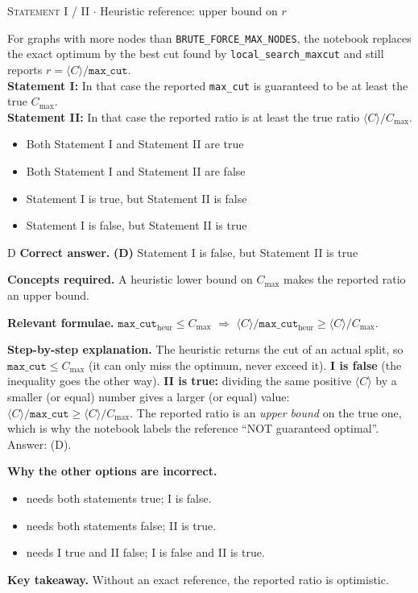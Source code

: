 \documentclass[11pt,a4paper]{article}
\newcommand{\optlabel}[1]{\textbf{(#1)}}
\newcommand{\correctlabel}[1]{\textcolor{okgreen}{\textbf{(#1)}\,\ding{51}}}
\newenvironment{qitem}[1]{\begin{list}{}{\setlength{\leftmargin}{3.3em}\setlength{\labelwidth}{3.1em}%
  \setlength{\labelsep}{0.2em}\setlength{\topsep}{3pt}\setlength{\parsep}{3pt}}\item[\textbf{Q.#1}\hfill]}{\end{list}}
\newcommand{\qsep}{\par\vspace{2pt}{\color{black!15}\hrule}\vspace{4pt}}
\newcommand{\qmeta}[2]{{\footnotesize\color{black!60}\textsc{#1} \;$\cdot$\; #2}\par}
\begin{document}
\begin{qitem}{74}
\qmeta{Statement I / II}{Heuristic reference: upper bound on $r$}
For graphs with more nodes than \texttt{BRUTE\_FORCE\_MAX\_NODES}, the notebook replaces the exact optimum by the best cut found
by \texttt{local\_search\_maxcut} and still reports $r = \langle C\rangle/\texttt{max\_cut}$.\\[1mm]
\textbf{Statement I:} In that case the reported \texttt{max\_cut} is guaranteed to be at least the true $C_{\max}$.\\[1mm]
\textbf{Statement II:} In that case the reported ratio is at least the true ratio $\langle C\rangle/C_{\max}$.
\begin{itemize}[leftmargin=2.6em, labelsep=0.4em, itemsep=2pt, topsep=3pt]
\item[\optlabel{A}] Both Statement I and Statement II are true
\item[\optlabel{B}] Both Statement I and Statement II are false
\item[\optlabel{C}] Statement I is true, but Statement II is false
\item[\correctlabel{D}] Statement I is false, but Statement II is true
\end{itemize}
\end{qitem}
\begin{solbox}{D}
\textbf{\color{brand}Correct answer.} \textcolor{okgreen}{\textbf{(D)}} Statement I is false, but Statement II is true

\textbf{\color{brand}Concepts required.} A heuristic lower bound on $C_{\max}$ makes the reported ratio an upper bound.

\textbf{\color{brand}Relevant formulae.} $\texttt{max\_cut}_{\text{heur}} \le C_{\max}$ $\Rightarrow$ $\langle C\rangle/\texttt{max\_cut}_{\text{heur}} \ge \langle C\rangle/C_{\max}$.

\textbf{\color{brand}Step-by-step explanation.} The heuristic returns the cut of an actual split, so $\texttt{max\_cut} \le C_{\max}$ (it can only miss the optimum, never exceed it).
\textbf{I is false} (the inequality goes the other way).
\textbf{II is true:} dividing the same positive $\langle C\rangle$ by a smaller (or equal) number gives a larger (or equal) value:
$\langle C\rangle/\texttt{max\_cut} \ge \langle C\rangle/C_{\max}$. The reported ratio is an \emph{upper bound} on the true one, which is why
the notebook labels the reference ``NOT guaranteed optimal''. Answer: (D).

\textbf{\color{brand}Why the other options are incorrect.}
\begin{itemize}[leftmargin=2.4em, itemsep=1pt, topsep=2pt]
\item[\textbf{(A)}] needs both statements true; I is false.
\item[\textbf{(B)}] needs both statements false; II is true.
\item[\textbf{(C)}] needs I true and II false; I is false and II is true.
\end{itemize}
\textbf{\color{brand}Key takeaway.} Without an exact reference, the reported ratio is optimistic.
\end{solbox}
\qsep
\end{document}
